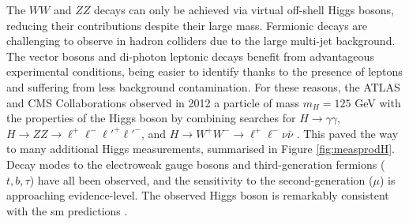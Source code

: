 The $WW$ and $ZZ$ decays can only be achieved via virtual off-shell Higgs bosons, reducing their contributions despite their large mass. Fermionic decays are challenging to observe in hadron colliders due to the large multi-jet background. The vector bosons and di-photon leptonic decays benefit from advantageous experimental conditions, being easier to identify thanks to the presence of leptons and suffering from less background contamination. For these reasons, the ATLAS and CMS Collaborations observed in 2012 a particle of mass $m_H = 125$ GeV with the properties of the Higgs boson by combining searches for $H \rightarrow \gamma\gamma$, $H \rightarrow ZZ \rightarrow \ell^+\ell^-\ell'^+\ell'^-$, and $H \rightarrow W^+W^- \rightarrow \ell^+\ell^-\nu \bar{\nu}$ \cite{ATLAS:2012yve, CMS:2012qbp}. This paved the way to many additional Higgs measurements, summarised in Figure \ref{fig:measprodH}. Decay modes to the electroweak gauge bosons and third-generation fermions ($t, b, \tau$) have all been observed, and the sensitivity to the second-generation ($\mu$) is approaching evidence-level. The observed Higgs boson is remarkably consistent with the \gls{sm} predictions \cite{ATLAS:2022vkf}. 
